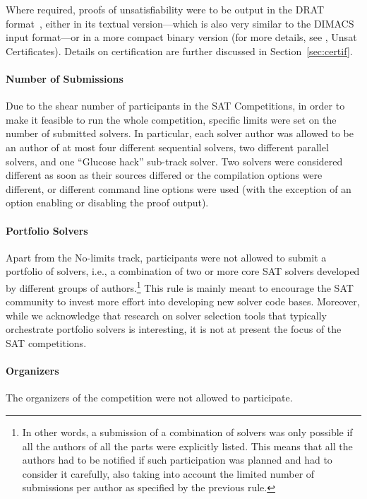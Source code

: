 \documentclass{elsarticle}
\begin{document}
Where required, proofs of unsatisfiability were to be output in the DRAT format~\cite{DRATtrim},
either in its textual version---which is also very similar to the DIMACS input format---or 
in a more compact binary version (for more details, see \cite{satComp2020www}, Unsat Certificates).
%
Details on certification are further discussed in Section~\ref{sec:certif}.

\paragraph{Number of Submissions}

Due to the shear number of participants in the SAT Competitions, in order to make it
feasible to run the whole competition, specific limits were set on the number of submitted solvers.
In particular, each solver author was allowed to be an author of at most four different sequential solvers,
two different parallel solvers, and one ``Glucose hack'' sub-track solver.
Two solvers were considered different as soon as their sources differed
or the compilation options were different, or different command line options were used
(with the exception of an option enabling or disabling the proof output).

\paragraph{Portfolio Solvers}

Apart from the No-limits track, participants were not allowed to submit a portfolio of solvers,
i.e., a combination of two or more core SAT solvers developed by different groups of authors.\footnote{In other words, a submission of a combination of solvers was only possible if all the authors of all the parts
were explicitly listed. This means that all the authors had to be notified if such participation
was planned and had to consider it carefully, also taking into account the limited number of submissions per author
as specified by the previous rule.}
This rule is mainly meant to encourage the SAT community to invest more effort into developing new solver code bases.
Moreover, while we acknowledge that research on solver selection tools that typically orchestrate portfolio solvers 
is interesting, it is not at present the focus of the SAT competitions.


\paragraph{Organizers}
The organizers of the competition were not allowed to participate.
\end{document}
